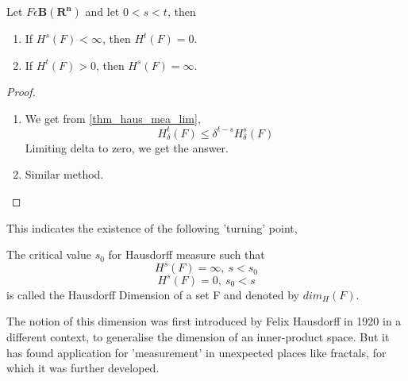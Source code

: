 \begin{theorem}
    Let $F \epsilon \bm{B(R^n)}$ and let $0 < s < t$, then
    \begin{enumerate}
        \item If $H^s(F) < \infty$, then $H^t(F) = 0$.
        \item If $H^t(F) > 0$, then $H^s(F) = \infty$.
    \end{enumerate}
\end{theorem}
\begin{proof}
    \begin{enumerate}
        \item We get from \ref{thm_haus_mea_lim},
            \[
                H^t_\delta(F) \leqslant \delta^{t-s}H^s_\delta(F)
            \]
            Limiting delta to zero, we get the answer.
        \item Similar method.
    \end{enumerate}
\end{proof}
This indicates the existence of the following 'turning' point,
\begin{definition}
    The critical value $s_0$ for Hausdorff measure such that
    \[
        H^s(F) = \infty, \: s<s_0
    \]
    \[
        H^s(F) = 0, \: s_0 < s
    \]
    is called the Hausdorff Dimension of a set F and denoted by $dim_H(F)$.
\end{definition}

The notion of this dimension was first introduced by Felix Hausdorff in 1920 in
a different context, to generalise the dimension of an inner-product space. But
it has found application for 'measurement' in unexpected places like fractals,
for which it was further developed.


